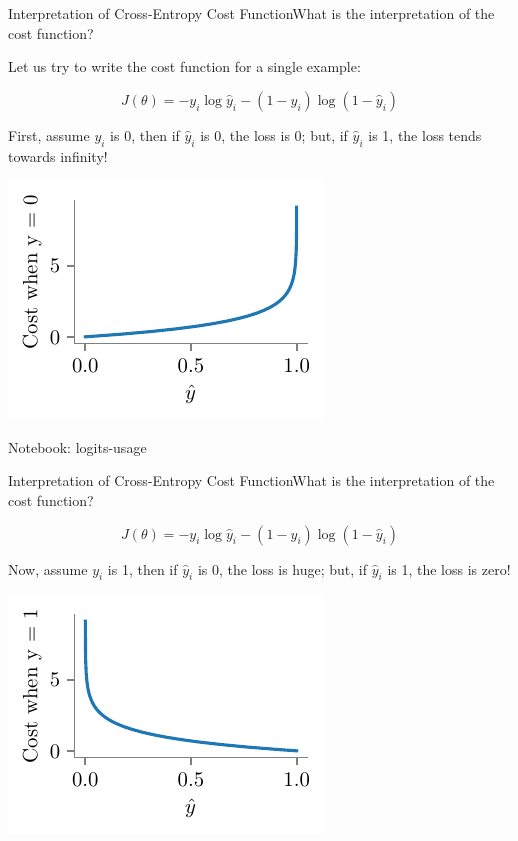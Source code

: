 \documentclass{beamer}
\begin{document}
\begin{frame}{Interpretation of Cross-Entropy Cost Function}\pause What is the interpretation of the cost function?

\pause Let us try to write the cost function for a single example:

\pause $$J(\theta) = -y_i\log{\hat{y}_i} - (1-y_i)\log({1-\hat{y}_i})$$

\pause First, assume $y_i$ is 0, then if $\hat{y}_i$ is 0, the loss is 0; but, if $\hat{y}_i$ is 1, the loss tends towards infinity!

	\includegraphics[scale=0.7]{../figures/logistic-regression/logistic-cross-cost-0}


\end{frame}

\begin{frame}
	Notebook: logits-usage
\end{frame}

\begin{frame}{Interpretation of Cross-Entropy Cost Function}\pause What is the interpretation of the cost function?



 $$J(\theta) = -y_i\log{\hat{y}_i} - (1-y_i)\log({1-\hat{y}_i})$$

\pause Now, assume $y_i$ is 1, then if $\hat{y}_i$ is 0, the loss is huge; but, if $\hat{y}_i$ is 1, the loss is zero!

\includegraphics[scale=0.7]{../figures/logistic-regression/logistic-cross-cost-1}


\end{frame}
\end{document}
